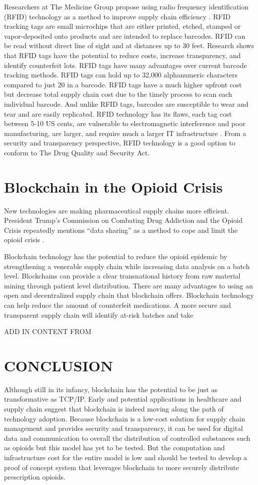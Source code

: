 \documentclass[sigconf]{acmart}
\begin{document}
Researchers at The Medicine Group propose using radio frequency identification (RFID) technology as a method to improve supply chain efficiency \cite{Taylor01}. RFID tracking tags are small microchips that are either printed, etched, stamped or vapor-deposited onto products and are intended to replace barcodes. RFID can be read without direct line of sight and at distances up to 30 feet. Research shows that RFID tags have the potential to reduce costs, increase transparency, and identify counterfeit lots. RFID tags have many advantages over current barcode tracking methods. RFID tags can hold up to 32,000 alphanumeric characters compared to just 20 in a barcode. RFID tags have a much higher upfront cost but decrease total supply chain cost due to the timely process to scan each individual barcode. And unlike RFID tags, barcodes are susceptible to wear and tear and are easily replicated. RFID technology has its flaws, each tag cost between 5-10 US cents, are vulnerable to electromagnetic interference and poor manufacturing, are larger, and require much a larger IT infrastructure \cite{Taylor01} \cite{opsis9}. From a security and transparency perspective, RFID technology is a good option to conform to The Drug Quality and Security Act.

\section{Blockchain in the Opioid Crisis}
New technologies are making pharmaceutical supply chains more efficient. President Trump's Commission on Combating Drug Addiction and the Opioid Crisis repeatedly mentions ``data sharing'' as a method to cope and limit the opioid crisis \cite{opsis3}.

Blockchain technology has the potential to reduce the opioid epidemic by strengthening a venerable supply chain while increasing data analysis on a batch level. Blockchains can provide a clear transnational history from raw material mining through patient level distribution. There are many advantages to using an open and decentralized supply chain that blockchain offers. Blockchain technology can help reduce the amount of counterfeit medications.  A more secure and transparent supply chain will identify at-risk batches and take 

ADD IN CONTENT FROM \cite{hitchingHealthcare}
\section{CONCLUSION}
Although still in its infancy, blockchain has the potential to be just as transformative as TCP/IP. Early and potential applications in healthcare and supply chain suggest that blockchain is indeed moving along the path of technology adoption. Because blockchain is a low-cost solution for supply chain management and provides security and transparency, it can be used for digital data and communication to overall the distribution of controlled substances such as opioids but this model has yet to be tested. But the computation and infrastructure cost for the entire model is low and should be tested to develop a proof of concept system that leverages blockchain to more securely distribute prescription opioids.
\end{document}
